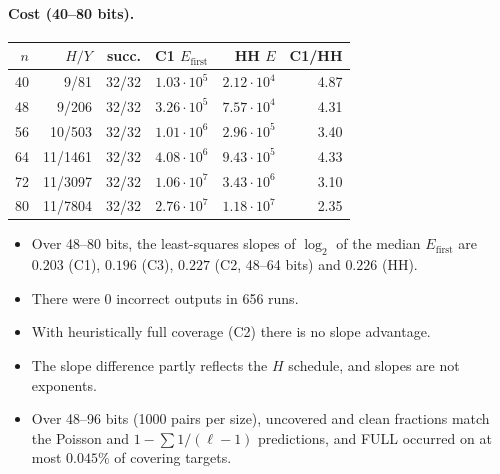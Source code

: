 \documentclass[11pt]{amsart}
\theoremstyle{definition}
\begin{document}
\paragraph{Cost (40--80 bits).}
\begin{center}
\footnotesize
\begin{tabular}{rrrrrr}
\toprule
$n$ & $H/Y$ & succ. & C1 $E_{\mathrm{first}}$ & HH $E$ & C1/HH\\
\midrule
40 & 9/81 & 32/32 & $1.03\cdot10^5$ & $2.12\cdot10^4$ & 4.87\\
48 & 9/206 & 32/32 & $3.26\cdot10^5$ & $7.57\cdot10^4$ & 4.31\\
56 & 10/503 & 32/32 & $1.01\cdot10^6$ & $2.96\cdot10^5$ & 3.40\\
64 & 11/1461 & 32/32 & $4.08\cdot10^6$ & $9.43\cdot10^5$ & 4.33\\
72 & 11/3097 & 32/32 & $1.06\cdot10^7$ & $3.43\cdot10^6$ & 3.10\\
80 & 11/7804 & 32/32 & $2.76\cdot10^7$ & $1.18\cdot10^7$ & 2.35\\
\bottomrule
\end{tabular}
\end{center}
\begin{itemize}
\item Over 48--80 bits, the least-squares slopes of $\log_2$ of the median $E_{\mathrm{first}}$
  are $0.203$ (C1), $0.196$ (C3), $0.227$ (C2, 48--64 bits) and $0.226$ (HH).
\item There were 0 incorrect outputs in 656 runs.
\item With heuristically full coverage (C2) there is no slope advantage.
\item The slope difference partly reflects the $H$ schedule, and slopes are not exponents.
\item Over 48--96 bits (1000 pairs per size), uncovered and clean fractions match the Poisson
  and $1-\sum1/(\ell-1)$ predictions, and FULL occurred on at most $0.045\%$ of covering targets.
\end{itemize}
\end{document}
